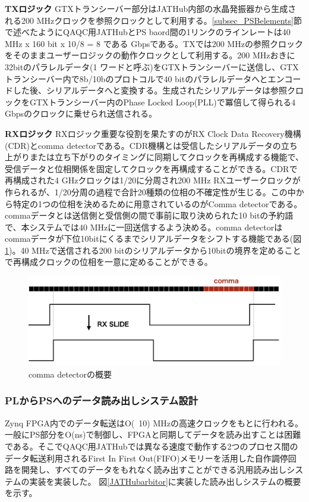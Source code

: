 \textbf{TXロジック}
\baselineskip
GTXトランシーバー部分はJATHub内部の水晶発振器から生成される200 MHzクロックを参照クロックとして利用する。\ref{subsec_PSBelements}節で述べたようにQAQC用JATHubとPS baord間の1リンクのラインレートは40 MHz x 160 bit x 10/8 = 8 である Gbpsである。TXでは200 MHzの参照クロックをそのままユーザーロジックの動作クロックとして利用する。200 MHzおきに32bitのパラレルデータ(1 ワードと呼ぶ)をGTXトランシーバーに送信し、GTXトランシーバー内で8b/10bのプロトコルで40 bitのパラレルデータへとエンコードした後、シリアルデータへと変換する。生成されたシリアルデータは参照クロックをGTXトランシーバー内のPhase Locked Loop(PLL)で冪倍して得られる4 Gbpsのクロックに乗せられ送信される。
\baselineskip

\textbf{RXロジック}
RXロジック重要な役割を果たすのがRX Clock Data Recovery機構(CDR)とcomma detectorである。CDR機構とは受信したシリアルデータの立ち上がりまたは立ち下がりのタイミングに同期してクロックを再構成する機能で、受信データと位相関係を固定してクロックを再構成することができる。CDRで再構成された4 GHzクロックは1/20に分周され200 MHz RXユーザークロックが作られるが、1/20分周の過程で合計20種類の位相の不確定性が生じる。この中から特定の1つの位相を決めるために用意されているのがComma detectorである。commaデータとは送信側と受信側の間で事前に取り決められた10 bitの予約語で、本システムでは40 MHzに一回送信するよう決める。comma detectorはcommaデータが下位10bitにくるまでシリアルデータをシフトする機能である(図\ref{JATHubcomma})。40 MHzで送信される200 bitのシリアルデータから10bitの境界を定めることで再構成クロックの位相を一意に定めることができる。

\begin{figure} 
\centering
\includegraphics[width=16cm]{fig/QAQC/JATHubcomma.png}
\caption[comma detectorの概要]{comma detectorの概要}
\label{JATHubcomma}
\end{figure}
\baselineskip


\subsubsection{PLからPSへのデータ読み出しシステム設計}
\label{subsubsec_readout}
Zynq FPGA内でのデータ転送はO(~10) MHzの高速クロックをもとに行われる。一般にPS部分をO(ns)で制御し、FPGAと同期してデータを読み出すことは困難である。そこでQAQC用JATHubでは異なる速度で動作する2つのプロセス間のデータ転送利用されるFirst In First Out(FIFO)メモリーを活用した自作調停回路を開発し、すべてのデータをもれなく読み出すことができる汎用読み出しシステムの実装を実装した。
図\ref{JATHubarbitor}に実装した読み出しシステムの概要を示す。

